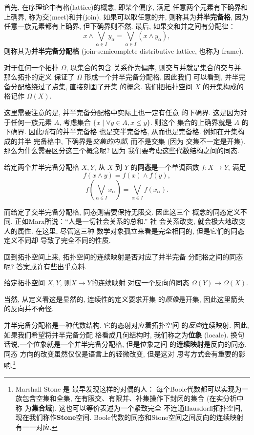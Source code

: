 首先, 在序理论中有格(lattice)的概念, 即某个偏序, 满足
任意两个元素有下确界和上确界, 称为交(meet)和并(join).
如果可以取任意的并, 则称其为\textbf{并半完备格},
因为任意一族元素都有上确界, 但下确界则不然.
最后, 如果交和并之间有分配律：
\[x \wedge \bigvee_{\alpha \in I} y_\alpha
= \bigvee_{\alpha \in I} (x \wedge y_\alpha),\]
则称其为\textbf{并半完备分配格} (join-semicomplete distributive lattice,
也称为 frame).

对于任何一个拓扑 \(\Omega\), 以集合的包含
关系作为偏序, 则交与并就是集合的交与并. 那么拓扑的定义
保证了 \(\Omega\) 形成一个并半完备分配格. 因此我们
可以看到, 并半完备分配格绕过了点集, 直接刻画了开集
的概念. 我们把拓扑空间 \(X\) 的开集构成的格记作 \(\Omega(X)\).

这里需要注意的是, 并半完备分配格中实际上也一定有任意
的下确界. 这是因为对于任何一族元素 \(A\), 考虑集合
\(\{x \mid \forall y \in A, x \le y\}\). 则这个
集合的上确界就是 \(A\) 的下确界. 因此所有的并半完备格
也是交半完备格, 从而也是完备格. 例如在开集构成的并半
完备格中, 下确界是\emph{交集的内部}, 而不是交集 (因为
交集不一定是开集). 那么为什么需要区分这三个概念呢? 因为
我们要考虑这些代数结构之间的同态.

\begin{definition}
给定两个并半完备分配格 \(X, Y\), 从 \(X\) 到 \(Y\)
的\textbf{同态}是一个单调函数 \(f : X \to Y\), 满足
\[f(x\wedge y) = f(x) \wedge f(y),\]
\[f\left(\bigvee_{\alpha \in I} x_\alpha\right)
= \bigvee_{\alpha \in I} f(x_\alpha).\]
\end{definition}

而给定了交半完备分配格, 同态则需要保持无限交. 因此这三个
概念的同态定义不同. 正如Marx所说：“人是一切社会关系的总和.” 社
会关系改变, 就会极大地改变人的属性. 在这里, 尽管这三种
数学对象孤立来看是完全相同的, 但是它们的同态定义不同却
导致了完全不同的性质.

回到拓扑空间上来, 拓扑空间的连续映射是否对应了并半完备
分配格之间的同态呢? 答案或许有些出乎意料.
\begin{theorem}
给定拓扑空间 \(X, Y\), 则\(X \to Y\)的连续映射
对应一个反向的同态 \(\Omega(Y) \to \Omega(X)\).
\end{theorem}
当然, 从定义看这是显然的, 连续性的定义要求开集
的\emph{原像}是开集, 因此这里箭头的反向并不奇怪.

并半完备分配格是一种代数结构. 它的态射对应着拓扑空间
的\emph{反向}连续映射. 因此, 如果我们希望将并半完备分配
格看成几何结构时, 我们称之为\textbf{位象} (locale).
换句话说,一个位象就是一个并半完备分配格, 但是位象之间
的\textbf{连续映射}是反向的同态. 同态
方向的改变虽然仅仅是语言上的轻微改变, 但是这对
思考方式会有重要的影响.\footnote{Marshall Stone 是
最早发现这样的对偶的人： 每个Boole代数都可以实现为一族包含空集和全集,
在有限交、有限并、补集操作下封闭的集合 (在实分析中称
为\textbf{集合域}). 这也可以等价表述为一个紧致完全
不连通Hausdorff拓扑空间, 现在我们称作\textbf{Stone}空间.
Boole代数的同态和Stone空间之间反向的连续映射有一一对应.}

